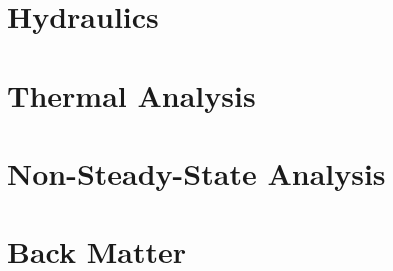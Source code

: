 \documentclass{tufte-book}
\begin{document}




\part{Hydraulics}








\part{Thermal Analysis}












\part{Non-Steady-State Analysis}





\part{Back Matter}
\backmatter





\appendix
\appendixpage
\noappendicestocpagenum
\addappheadtotoc
\end{document}
